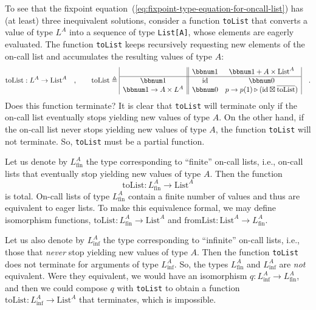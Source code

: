 To see that the fixpoint equation~(\ref{eq:fixpoint-type-equation-for-oncall-list})
has (at least) three inequivalent solutions, consider a function \lstinline!toList!
that converts a value of type $L^{A}$ into a sequence of type \lstinline!List[A]!,
whose elements are eagerly evaluated. The function \lstinline!toList!
keeps recursively requesting new elements of the on-call list and
accumulates the resulting values of type $A$:
\[
\text{toList}:L^{A}\rightarrow\text{List}^{A}\quad,\quad\quad\text{toList}\triangleq\begin{array}{|c||cc|}
 & \bbnum 1 & \bbnum 1+A\times\text{List}^{A}\\
\hline \bbnum 1 & \text{id} & \bbnum 0\\
\bbnum 1\rightarrow A\times L^{A} & \bbnum 0 & p\rightarrow p(1)\triangleright(\text{id}\boxtimes\overline{\text{toList}})
\end{array}\quad.
\]
Does this function terminate? It is clear that \lstinline!toList!
will terminate only if the on-call list eventually stops yielding
new values of type $A$. On the other hand, if the on-call list never
stops yielding new values of type $A$, the function \lstinline!toList!
will not terminate. So, \lstinline!toList!
must be a partial function. 

Let us denote by $L_{\text{fin}}^{A}$ the type corresponding to \textsf{``}finite\textsf{''}
on-call lists, i.e., on-call lists that eventually stop yielding new
values of type $A$. Then the function
\[
\text{toList}:L_{\text{fin}}^{A}\rightarrow\text{List}^{A}
\]
is total. On-call lists of type $L_{\text{fin}}^{A}$ contain a finite
number of values and thus are equivalent to eager lists. To make this
equivalence formal, we may define isomorphism functions, $\text{toList}:L_{\text{fin}}^{A}\rightarrow\text{List}^{A}$
and $\text{fromList}:\text{List}^{A}\rightarrow L_{\text{fin}}^{A}$. 

Let us also denote by $L_{\text{inf}}^{A}$ the type corresponding
to \textsf{``}infinite\textsf{''} on-call lists, i.e., those that \emph{never} stop
yielding new values of type $A$. Then the function \lstinline!toList!
does not terminate for arguments of type $L_{\text{inf}}^{A}$. So,
the types $L_{\text{fin}}^{A}$ and $L_{\text{inf}}^{A}$ are \emph{not}
equivalent. Were they equivalent, we would have an isomorphism $q:L_{\text{inf}}^{A}\rightarrow L_{\text{fin}}^{A}$,
and then we could compose $q$ with \lstinline!toList!
to obtain a function $\text{toList}:L_{\text{inf}}^{A}\rightarrow\text{List}^{A}$
that terminates, which is impossible.

